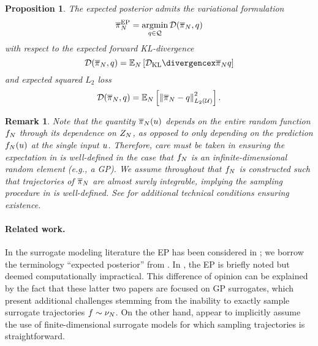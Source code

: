 \documentclass[12pt]{article}
\newtheorem{prop}{Proposition}
\newtheorem{rmk}{Remark}
\begin{document}
\begin{prop} \label{prop:EP-variational}
The expected posterior admits the variational formulation 
\begin{equation}
\overline{\pi}_{N}^{\mathrm{EP}} = \operatorname*{argmin}_{q \in \mathcal{Q}} \mathcal{D}(\overline{\pi}_{N}, q)
\end{equation}
with respect to the expected forward KL-divergence
\begin{equation}
\mathcal{D}(\postNormEm, q) = \emE \left[\KL{\postNormEm}{q}\right]
\end{equation}
and expected squared $L_2$ loss
\begin{equation}
\mathcal{D}(\overline{\pi}_{N}, q) = \mathbb{E}_{N} \left[\left\lVert\overline{\pi}_{N} - q\right\rVert_{L_2(\mathcal{U})}^2\right].
\end{equation}
\end{prop}

\begin{rmk}
Note that the quantity $\overline{\pi}_{N}(u)$ depends on the entire random function $f_{N}$ 
through its dependence on $Z_{N}$, as opposed to only depending on the prediction 
$f_{N}(u)$ at the single input $u$. Therefore, care must be taken in ensuring the 
expectation in  is well-defined in the case that $f_{N}$ is an 
infinite-dimensional random element (e.g., a GP). We assume throughout that $f_{N}$ is 
constructed such that 
trajectories of $\overline{\pi}_{N}$ are almost surely integrable, implying the sampling procedure
in  is well-defined. See 
\citet{StuartTeck1,StuartTeck2,random_fwd_models,garegnani2021NoisyMCMC} for additional
technical conditions ensuring existence. 
\end{rmk}

\paragraph{Related work.} In the surrogate modeling literature the EP has been considered 
in \citet{trainDynamics,BurknerSurrogate,garegnani2021NoisyMCMC}; we borrow 
the terminology ``expected posterior'' from \citet{BurknerSurrogate}. In 
\citet{StuartTeck2,VehtariParallelGP}, the EP is briefly noted but deemed computationally impractical. 
This difference of opinion can be explained by the fact that these latter two papers are focused 
on GP surrogates, which present additional challenges stemming from the inability to exactly 
sample surrogate trajectories $f \sim \nu_{N}$. On the other hand, 
\citet{BurknerSurrogate,garegnani2021NoisyMCMC} appear to implicitly assume the use of 
finite-dimensional surrogate models for which sampling trajectories is straightforward.
\end{document}
